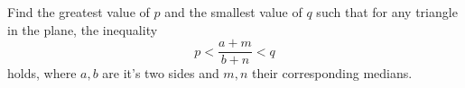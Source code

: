 Find the greatest value of $p$ and the smallest value of $q$ such that for any triangle in the plane, the inequality
\[p<\frac{a+m}{b+n}<q\]
holds, where $a,b$ are it's two sides and $m,n$ their corresponding medians.